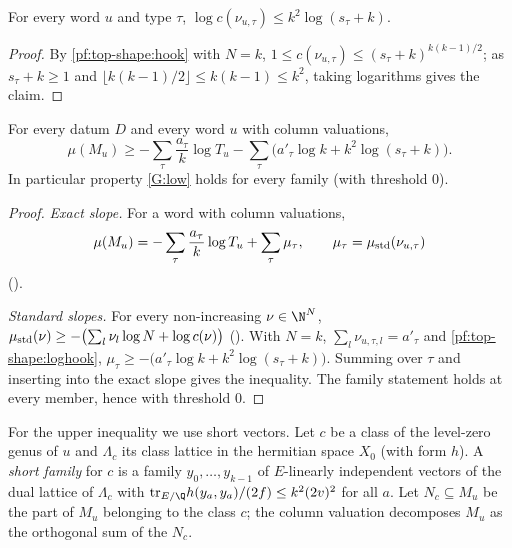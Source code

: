 \begin{lemma}\label{pf:top-shape:loghook}
For every word $u$ and type $\tau$, $\log c(\nu_{u,\tau})\le k^2\log(s_\tau+k)$.
\end{lemma}

\begin{proof}
By \cref{pf:top-shape:hook} with $N=k$, $1\le c(\nu_{u,\tau})\le(s_\tau+k)^{k(k-1)/2}$; as $s_\tau+k\ge1$ and
$\lfloor k(k-1)/2\rfloor\le k(k-1)\le k^2$, taking logarithms gives the claim.
\end{proof}

\begin{theorem}\label{pf:top-shape:lowslope}
For every datum $D$ and every word $u$ with column valuations,
\[
\mu(M_u)\ge-\sum_\tau\frac{a_\tau}k\log T_u-\sum_\tau\bigl(a'_\tau\log k+k^2\log(s_\tau+k)\bigr).
\]
In particular property \ref{G:low} holds for every family (with threshold $0$).
\end{theorem}

\begin{proof}
\emph{Exact slope.} For a word with column valuations,
\[
\mu(M_u)=-\sum_\tau\frac{a_\tau}k\log T_u+\sum_\tau\mu_\tau,\qquad\mu_\tau=\mu_{\rm std}(\nu_{u,\tau})
\]
().

\emph{Standard slopes.} For every non-increasing $\nu\in\N^N$,
$\mu_{\rm std}(\nu)\ge-\bigl(\sum_l\nu_l\log N+\log c(\nu)\bigr)$ (). With $N=k$,
$\sum_l\nu_{u,\tau,l}=a'_\tau$ and \cref{pf:top-shape:loghook},
$\mu_\tau\ge-\bigl(a'_\tau\log k+k^2\log(s_\tau+k)\bigr)$. Summing over $\tau$ and inserting into the exact slope gives the
inequality. The family statement holds at every member, hence with threshold $0$.
\end{proof}

For the upper inequality we use short vectors. Let $c$ be a class of the level-zero genus of $u$ and $\Lambda_c$ its
class lattice in the hermitian space $X_0$ (with form $h$). A \emph{short family} for $c$ is a family $y_0,\dots,y_{k-1}$
of $E$-linearly independent vectors of the dual lattice of $\Lambda_c$ with
$\mathrm{tr}_{E/\Q}h(y_a,y_a)/(2f)\le k^2(2v)^2$ for all $a$. Let $N_c\subseteq M_u$ be the part of $M_u$ belonging to the
class $c$; the column valuation decomposes $M_u$ as the orthogonal sum of the $N_c$.

